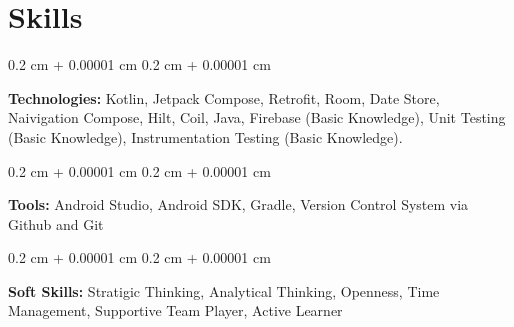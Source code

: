 \documentclass[10pt, letterpaper]{article}
\newenvironment{onecolentry}{
    \begin{adjustwidth}{
        0.2 cm + 0.00001 cm
    }{
        0.2 cm + 0.00001 cm
    }
}{
    \end{adjustwidth}
} %
\begin{document}
    
    \section{Skills}



        
        \begin{onecolentry}
            \textbf{Technologies:} Kotlin, Jetpack Compose, Retrofit, Room, Date Store, Naivigation Compose, Hilt, Coil, Java, Firebase (Basic Knowledge), Unit Testing (Basic Knowledge), Instrumentation Testing (Basic Knowledge).
        \end{onecolentry}

        \vspace{0.2 cm}

        \begin{onecolentry}
            \textbf{Tools:} Android Studio, Android SDK, Gradle, Version Control System via Github and Git
        \end{onecolentry}

        \vspace{0.2 cm}

        \begin{onecolentry}
            \textbf{Soft Skills:} Stratigic Thinking, Analytical Thinking, Openness, Time Management, Supportive Team Player, Active Learner
        \end{onecolentry}


    
\end{document}
